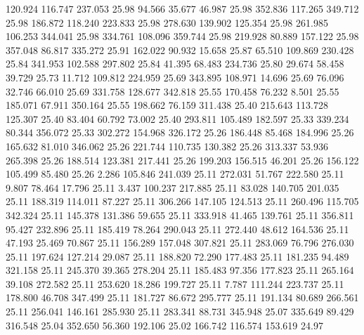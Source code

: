  120.924  116.747  237.053        25.98
  94.566   35.677   46.987        25.98
 352.836  117.265  349.712        25.98
 186.872  118.240  223.833        25.98
 278.630  139.902  125.354        25.98
 261.985  106.253  344.041        25.98
 334.761  108.096  359.744        25.98
 219.928   80.889  157.122        25.98
 357.048   86.817  335.272        25.91
 162.022   90.932   15.658        25.87
  65.510  109.869  230.428        25.84
 341.953  102.588  297.802        25.84
  41.395   68.483  234.736        25.80
  29.674   58.458   39.729        25.73
  11.712  109.812  224.959        25.69
 343.895  108.971   14.696        25.69
  76.096   32.746   66.010        25.69
 331.758  128.677  342.818        25.55
 170.458   76.232    8.501        25.55
 185.071   67.911  350.164        25.55
 198.662   76.159  311.438        25.40
 215.643  113.728  125.307        25.40
  83.404   60.792   73.002        25.40
 293.811  105.489  182.597        25.33
 339.234   80.344  356.072        25.33
 302.272  154.968  326.172        25.26
 186.448   85.468  184.996        25.26
 165.632   81.010  346.062        25.26
 221.744  110.735  130.382        25.26
 313.337   53.936  265.398        25.26
 188.514  123.381  217.441        25.26
 199.203  156.515   46.201        25.26
 156.122  105.499   85.480        25.26
   2.286  105.846  241.039        25.11
 272.031   51.767  222.580        25.11
   9.807   78.464   17.796        25.11
   3.437  100.237  217.885        25.11
  83.028  140.705  201.035        25.11
 188.319  114.011   87.227        25.11
 306.266  147.105  124.513        25.11
 260.496  115.705  342.324        25.11
 145.378  131.386   59.655        25.11
 333.918   41.465  139.761        25.11
 356.811   95.427  232.896        25.11
 185.419   78.264  290.043        25.11
 272.440   48.612  164.536        25.11
  47.193   25.469   70.867        25.11
 156.289  157.048  307.821        25.11
 283.069   76.796  276.030        25.11
 197.624  127.214   29.087        25.11
 188.820   72.290  177.483        25.11
 181.235   94.489  321.158        25.11
 245.370   39.365  278.204        25.11
 185.483   97.356  177.823        25.11
 265.164   39.108  272.582        25.11
 253.620   18.286  199.727        25.11
   7.787  111.244  223.737        25.11
 178.800   46.708  347.499        25.11
 181.727   86.672  295.777        25.11
 191.134   80.689  266.561        25.11
 256.041  146.161  285.930        25.11
 283.341   88.731  345.948        25.07
 335.649   89.429  316.548        25.04
 352.650   56.360  192.106        25.02
 166.742  116.574  153.619        24.97

